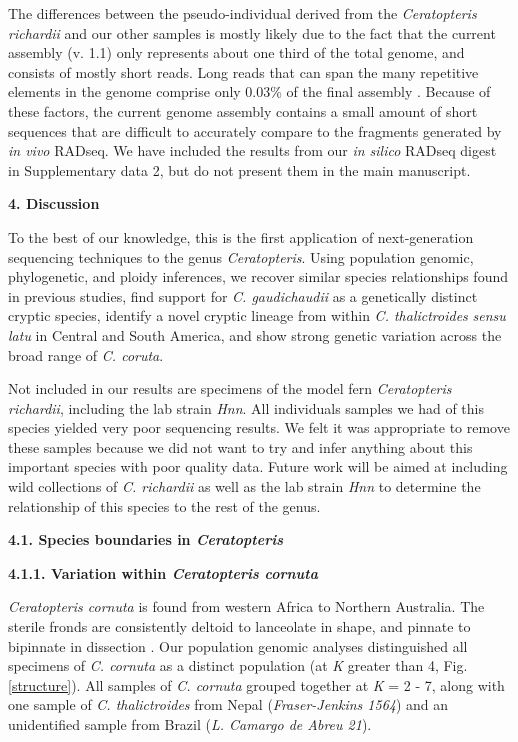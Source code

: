 \documentclass[12pt]{article}
\begin{document}
\begin{flushleft}
The differences between the pseudo-individual derived from the \textit{Ceratopteris richardii} and our other samples is mostly likely due to the fact that the current assembly (v. 1.1) only represents about one third of the total genome, and consists of mostly short reads. Long reads that can span the many repetitive elements in the genome comprise only 0.03\% of the final assembly \autocite{Marchant2019}. Because of these factors, the current genome assembly contains a small amount of short sequences that are difficult to accurately compare to the fragments generated by \textit{in vivo} RADseq. We have included the results from our \textit{in silico} RADseq digest in Supplementary data 2, but do not present them in the main manuscript.

\vspace{1cm}

{\large\textbf{4. Discussion}}

To the best of our knowledge, this is the first application of next-generation sequencing techniques to the genus \textit{Ceratopteris}. Using population genomic, phylogenetic, and ploidy inferences, we recover similar species relationships found in previous studies, find support for \textit{C. gaudichaudii} as a genetically distinct cryptic species, identify a novel cryptic lineage from within \textit{C. thalictroides} \textit{sensu latu} in Central and South America, and show strong genetic variation across the broad range of \textit{C. coruta}.

Not included in our results are specimens of the model fern \textit{Ceratopteris richardii}, including the lab strain \textit{Hnn}. All individuals samples we had of this species yielded very poor sequencing results. We felt it was appropriate to remove these samples because we did not want to try and infer anything about this important species with poor quality data. Future work will be aimed at including wild collections of \textit{C. richardii} as well as the lab strain \textit{Hnn} to determine the relationship of this species to the rest of the genus.

\textbf{4.1. Species boundaries in \textit{Ceratopteris}} 

\textbf{4.1.1. Variation within \textit{Ceratopteris cornuta}}

\textit{Ceratopteris cornuta} is found from western Africa to Northern Australia. The sterile fronds are consistently deltoid to lanceolate in shape, and pinnate to bipinnate in dissection \autocite{LloydTax1974}. Our population genomic analyses distinguished all specimens of \textit{C. cornuta} as a distinct population (at \textit{K} greater than 4, Fig. \ref{structure}). All samples of \textit{C. cornuta} grouped together at \textit{K} = 2 - 7, along with one sample of \textit{C. thalictroides} from Nepal (\textit{Fraser-Jenkins 1564}) and an unidentified sample from Brazil (\textit{L. Camargo de Abreu 21}). 


\end{flushleft}
\end{document}
